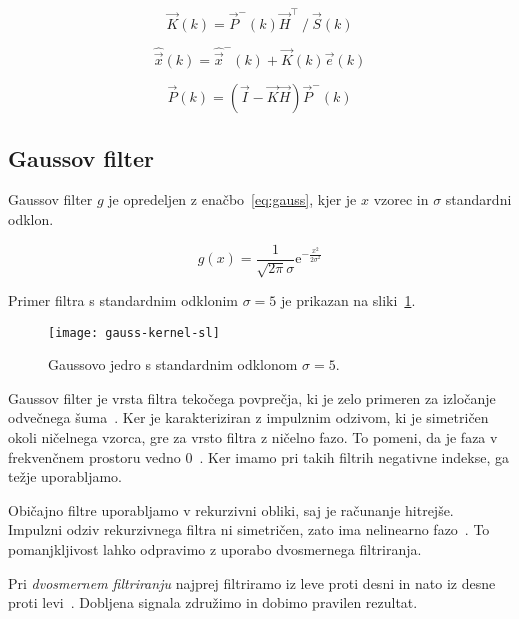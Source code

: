 \begin{equation}
\vec{K}(k) = {\vec{P}^-(k) \vec{H}^\top} ~/~ {\vec{S}(k)}
\label{eq:ojacanje}
\end{equation}

\begin{equation}
\hat{\vec{x}}(k) = \hat{\vec{x}}^-(k) + \vec{K}(k) \vec{e}(k)
\label{eq:aposteriori-stanje}
\end{equation}

\begin{equation}
\vec{P}(k) = \left( \vec{I} - \vec{K} \vec{H} \right) \vec{P}^-(k)
\label{eq:aposteriori-p}
\end{equation}








\subsection{Gaussov filter}\label{sec:gaussov-filter}
Gaussov filter $g$ je opredeljen z enačbo~\eqref{eq:gauss}, kjer je $x$ vzorec in $\sigma$ standardni odklon. 


\begin{equation}
g(x) = \frac{1}{\sqrt{2 \pi} \sigma} \mathrm{e}^{-\frac{x^2}{2 \sigma^2}} 
\label{eq:gauss}
\end{equation}


Primer filtra s standardnim odklonim $\sigma = 5$ je prikazan na sliki~\ref{fig:gauss}.

\begin{figure}[!htb]
\centering
\texttt{[image: gauss-kernel-sl]}
\caption[Gaussovo jedro s standardnim odklonom $\sigma=5$]{Gaussovo jedro s standardnim odklonom $\sigma=5$. }
\label{fig:gauss}
\end{figure}


Gaussov filter je vrsta filtra tekočega povprečja, ki je zelo primeren za izločanje odvečnega šuma~\cite{smith1997scientist}. Ker je karakteriziran z impulznim odzivom, ki je simetričen okoli ničelnega vzorca, gre za vrsto filtra z ničelno fazo. To pomeni, da je faza v frekvenčnem prostoru vedno $0$~\cite{smith1997scientist}. Ker imamo pri takih filtrih negativne indekse, ga težje uporabljamo. 

Običajno filtre uporabljamo v rekurzivni obliki, saj je računanje hitrejše. Impulzni odziv rekurzivnega filtra ni simetričen, zato ima nelinearno fazo~\cite{smith1997scientist}. To pomanjkljivost lahko odpravimo z uporabo dvosmernega filtriranja.

Pri \emph{dvosmernem filtriranju} najprej filtriramo iz leve proti desni in nato iz desne proti levi~\cite{smith1997scientist}. Dobljena signala združimo in dobimo pravilen rezultat.


